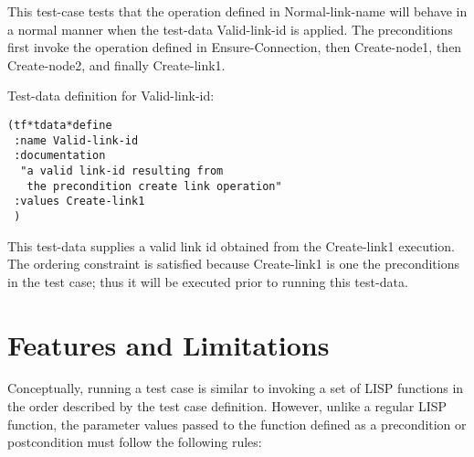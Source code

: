 This test-case tests that the operation defined in Normal-link-name
will behave in a normal manner when the test-data Valid-link-id is applied.
The preconditions first invoke the operation defined in
Ensure-Connection, then Create-node1, then Create-node2, and finally
Create-link1.

\noindent Test-data definition for Valid-link-id:

\small\begin{verbatim}
(tf*tdata*define
 :name Valid-link-id  
 :documentation 
  "a valid link-id resulting from 
   the precondition create link operation"
 :values Create-link1 
 )
\end{verbatim}\normalsize

This test-data supplies a valid link id obtained from the Create-link1
execution.  The ordering constraint is satisfied because
Create-link1 is one the preconditions in the test case; thus
it will be executed prior to running this test-data.  


\section{Features and Limitations}

Conceptually, running a test case is similar to invoking a set of LISP
functions in the order described by the test case definition.
However, unlike a regular LISP function, the parameter values passed
to the function defined as a precondition or postcondition must follow
the following rules:

